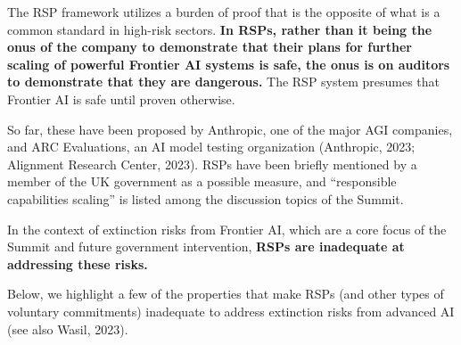 \documentclass[12pt,a4paper]{article}
\begin{document}
The RSP framework utilizes a burden of proof that is the opposite of what is a common standard in high-risk sectors.\textbf{ In RSPs, rather than it being the onus of the company to demonstrate that their plans for further scaling of powerful Frontier AI systems is safe, the onus is on auditors to demonstrate that they are dangerous.} The RSP system presumes that Frontier AI is safe until proven otherwise.  

So far, these have been proposed by Anthropic, one of the major AGI companies, and ARC Evaluations, an AI model testing organization (Anthropic, 2023; Alignment Research Center, 2023). RSPs have been briefly mentioned by a member of the UK government as a possible measure, and “responsible capabilities scaling” is listed among the discussion topics of the Summit.

In the context of extinction risks from Frontier AI, which are a core focus of the Summit and future government intervention, \textbf{RSPs are inadequate at addressing these risks.}

Below, we highlight a few of the properties that make RSPs (and other types of voluntary commitments) inadequate to address extinction risks from advanced AI (see also Wasil, 2023).
\end{document}
